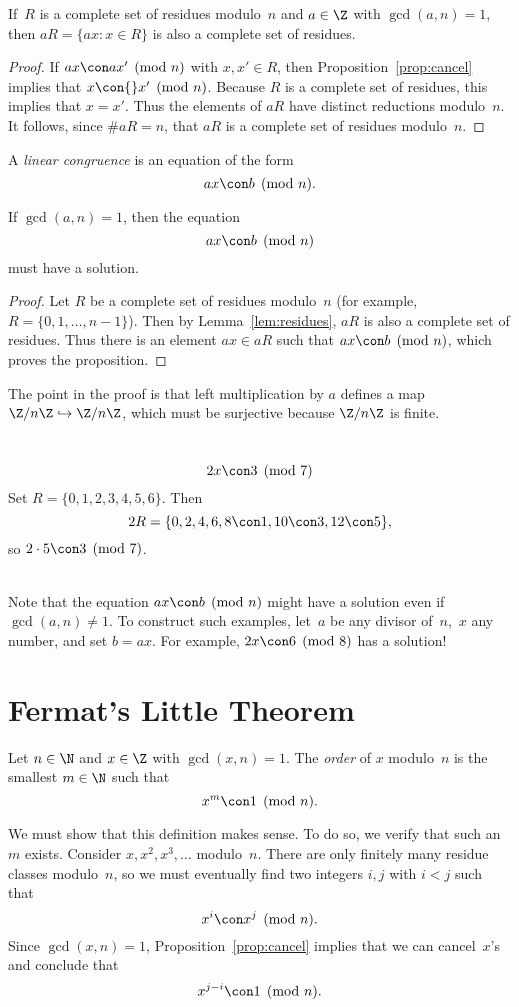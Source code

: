 \documentclass[11pt]{report}
\begin{document}
\begin{lemma}\label{lem:residues}
  If~$R$ is a complete set of residues modulo~$n$ and $a\in\Z$ with
  $\gcd(a,n)=1$, then $aR = \{ax : x \in R\}$
  is also a complete set of residues.
\end{lemma}
\begin{proof}
  If $ax\con ax'\pmod{n}$ with $x, x'\in R$, then
  Proposition~\ref{prop:cancel} implies that $x\con{}x'\pmod{n}$.
  Because $R$ is a complete set of residues, this implies
  that $x=x'$.  Thus the elements of
  $aR$ have distinct reductions modulo~$n$.
  It follows, since $\#aR=n$, that $aR$ is a
  complete set of residues modulo~$n$.
\end{proof}


\begin{definition}
  A {\em linear congruence} is an equation of the form
  $$
    ax\con b\pmod{n}.
  $$
\end{definition}
\begin{proposition}
  If $\gcd(a,n)=1$, then the equation
  $$
    ax\con b\pmod{n}
  $$
  must have a solution.
\end{proposition}
\begin{proof}
  Let $R$ be a complete set of residues modulo~$n$ (for
  example, $R=\{0,1,\ldots,n-1\}$).
  Then by Lemma~\ref{lem:residues},
  $aR$ is also a complete set of residues.
  Thus there is an element $ax\in aR$ such
  that $ax\con b\pmod{n}$, which proves
  the proposition.
\end{proof}
The point in the proof is that left multiplication by $a$ defines
a map $\Z/n\Z\hookrightarrow \Z/n\Z$, which must be surjective
because $\Z/n\Z$ is finite.

\\
$$
  2x\con 3\pmod{7}
$$
Set $R = \{0,1,2,3,4,5,6\}$.
Then
$$
  2R = \{0,2,4,6,8\con 1, 10\con 3, 12\con 5\},
$$
so $2\cdot 5\con 3\pmod{7}$.

\\
Note that the equation $ax\con b\pmod{n}$
might have a solution even if $\gcd(a,n)\neq 1$.  To construct
such examples, let~$a$ be any divisor of~$n$,~$x$
any number, and set $b=ax$.
For example, $2x\con 6\pmod{8}$ has a solution!


\section{Fermat's Little Theorem}

\begin{definition}[Order]
  Let $n\in\N$ and $x\in\Z$ with $\gcd(x,n)=1$.
  The {\em order} of $x$ modulo~$n$ is the smallest $m\in\N$
  such that
  $$
    x^m \con 1\pmod{n}.
  $$
\end{definition}
We must show that this definition makes sense.  To do so, we verify
that such an~$m$ exists.  Consider $x, x^2, x^3, \ldots$ modulo~$n$.
There are only finitely many residue classes modulo~$n$, so we must
eventually find two integers $i, j$ with $i<j$ such that
$$
  x^i\con x^j\pmod{n}.
$$
Since $\gcd(x,n)=1$, Proposition~\ref{prop:cancel} implies that
we can cancel~$x$'s and conclude that
$$
  x^{j-i}\con 1\pmod{n}.
$$
\end{document}
